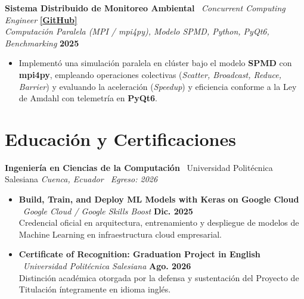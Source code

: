\documentclass[9.5pt, letterpaper]{article}
\begin{document}
\noindent
\textbf{Sistema Distribuido de Monitoreo Ambiental} \textbar\ \textit{Concurrent Computing Engineer} \hfill \href{https://github.com/David5Uzhca/Sistema-de-Monitoreo-Ambiental-Concurrente}{\textbf{[GitHub]}}\\
\textit{Computación Paralela (MPI / mpi4py), Modelo SPMD, Python, PyQt6, Benchmarking} \hfill \textbf{2025}
\begin{itemize}
    \item Implementó una simulación paralela en clúster bajo el modelo \textbf{SPMD} con \textbf{mpi4py}, empleando operaciones colectivas (\textit{Scatter, Broadcast, Reduce, Barrier}) y evaluando la aceleración (\textit{Speedup}) y eficiencia conforme a la Ley de Amdahl con telemetría en \textbf{PyQt6}.
\end{itemize}

\section{Educación y Certificaciones}
\noindent
\textbf{Ingeniería en Ciencias de la Computación} \textbar\ Universidad Politécnica Salesiana \hfill \textit{Cuenca, Ecuador \textbar\ Egreso: 2026}\\
\vspace{-2pt}
\begin{itemize}
    \item \textbf{Build, Train, and Deploy ML Models with Keras on Google Cloud} \textbar\ \textit{Google Cloud / Google Skills Boost} \hfill \textbf{Dic. 2025}\\
    Credencial oficial en arquitectura, entrenamiento y despliegue de modelos de Machine Learning en infraestructura cloud empresarial.
    \item \textbf{Certificate of Recognition: Graduation Project in English} \textbar\ \textit{Universidad Politécnica Salesiana} \hfill \textbf{Ago. 2026}\\
    Distinción académica otorgada por la defensa y sustentación del Proyecto de Titulación íntegramente en idioma inglés.
\end{itemize}
\end{document}
